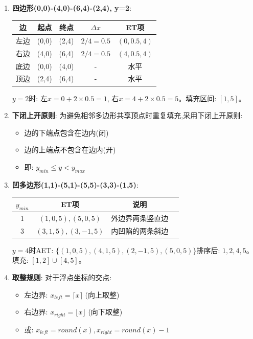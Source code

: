 \documentclass[UTF8]{ctexart}
\begin{document}
\begin{enumerate}
    \item \textbf{四边形(0,0)-(4,0)-(6,4)-(2,4), y=2}:
    \begin{center}
    \begin{tabular}{ccccc}
    \toprule 边 & 起点 & 终点 & $\Delta x$ & ET项 \\ \midrule
    左边 & (0,0) & (2,4) & $2/4=0.5$ & $(0, 0.5, 4)$ \\
    右边 & (4,0) & (6,4) & $2/4=0.5$ & $(4, 0.5, 4)$ \\
    底边 & (0,0) & (4,0) & - & 水平 \\
    顶边 & (2,4) & (6,4) & - & 水平 \\ \bottomrule
    \end{tabular}
    \end{center}
    $y=2$时: 左$x=0+2\times 0.5=1$, 右$x=4+2\times 0.5=5$。填充区间: $[1,5]$。
    
    \item \textbf{下闭上开原则}: 为避免相邻多边形共享顶点时重复填充,采用下闭上开原则:
    \begin{itemize}
        \item 边的下端点包含在边内(闭)
        \item 边的上端点不包含在边内(开)
        \item 即: $y_{min} \le y < y_{max}$
    \end{itemize}
    
    \item \textbf{凹多边形(1,1)-(5,1)-(5,5)-(3,3)-(1,5)}:
    \begin{center}
    \begin{tabular}{cccc}
    \toprule $y_{min}$ & ET项 & 说明 \\ \midrule
    1 & $(1,0,5), (5,0,5)$ & 外边界两条竖直边 \\
    3 & $(3,1,5), (3,-1,5)$ & 内凹陷的两条斜边 \\ \bottomrule
    \end{tabular}
    \end{center}
    $y=4$时AET: $\{(1,0,5), (4,1,5), (2,-1,5), (5,0,5)\}$排序后: $1,2,4,5$。填充: $[1,2]\cup[4,5]$。
    
    \item \textbf{取整规则}: 对于浮点坐标的交点:
    \begin{itemize}
        \item 左边界: $x_{left} = \lceil x \rceil$ (向上取整)
        \item 右边界: $x_{right} = \lfloor x \rfloor$ (向下取整)
        \item 或: $x_{left} = round(x), x_{right} = round(x)-1$
    \end{itemize}
    

\end{enumerate}
\end{document}
